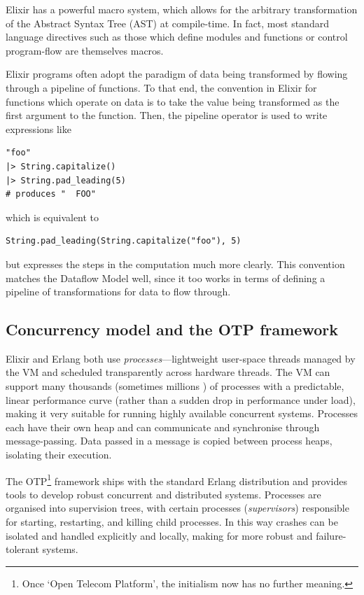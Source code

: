 Elixir has a powerful macro system, which allows for the arbitrary transformation of the Abstract Syntax Tree (AST) at compile-time.
In fact, most standard language directives such as those which define modules and functions or control program-flow are themselves macros.

Elixir programs often adopt the paradigm of data being transformed by flowing through a pipeline of functions.
To that end, the convention in Elixir for functions which operate on data is to take the value being transformed as the first argument to the function.
Then, the pipeline operator \exs{|>} is used to write expressions like
\begin{verbatim}
"foo"
|> String.capitalize()
|> String.pad_leading(5)
# produces "  FOO"
\end{verbatim}
which is equivalent to
\begin{verbatim}
String.pad_leading(String.capitalize("foo"), 5)		
\end{verbatim}
but expresses the steps in the computation much more clearly.
This convention matches the Dataflow Model well, since it too works in terms of defining a pipeline of transformations for data to flow through.

\subsection{Concurrency model and the OTP framework}\label{sec:prep:elixir:otp}

Elixir and Erlang both use \emph{processes}---lightweight user-space threads managed by the VM and scheduled transparently across hardware threads.
The VM can support many thousands (sometimes millions \cite{elixir-2million-processes}) of processes with a predictable, linear performance curve (rather than a sudden drop in performance under load), making it very suitable for running highly available concurrent systems.
Processes each have their own heap and can communicate and synchronise through message-passing.
Data passed in a message is copied between process heaps, isolating their execution.

The OTP\footnote{
Once `Open Telecom Platform', the initialism now has no further meaning.
} framework ships with the standard Erlang distribution and provides tools to develop robust concurrent and distributed systems.
Processes are organised into supervision trees, with certain processes (\emph{supervisors}) responsible for starting, restarting, and killing child processes.
In this way crashes can be isolated and handled explicitly and locally, making for more robust and failure-tolerant systems.

